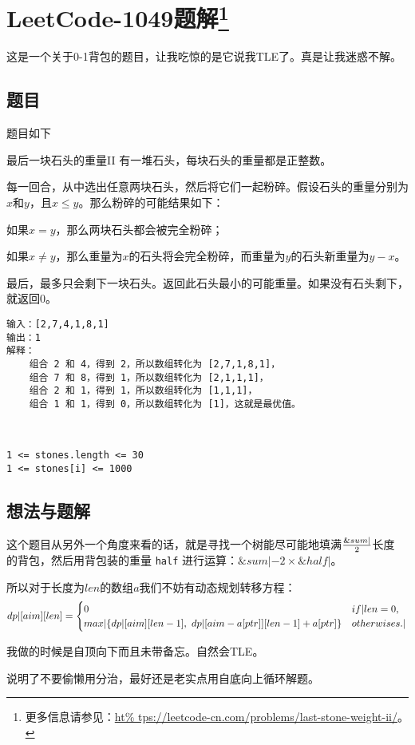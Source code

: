 
\section[LeetCode-1049题解]{LeetCode-1049题解\footnote{更多信息请参见：\url{ht%
tps://leetcode-cn.com/problems/last-stone-weight-ii/}。}}

这是一个关于0-1背包的题目，让我吃惊的是它说我TLE了。真是让我迷惑不解。

\subsection{题目}

题目如下
\begin{Exple}{最后一块石头的重量II}
有一堆石头，每块石头的重量都是正整数。

每一回合，从中选出任意两块石头，然后将它们一起粉碎。假设石头的重量分别为$x$和$y$，且$x\le y$。那么粉碎的可能结果如下：

如果$x=y$，那么两块石头都会被完全粉碎；

如果$x\ne y$，那么重量为$x$的石头将会完全粉碎，而重量为$y$的石头新重量为$y-x$。

最后，最多只会剩下一块石头。返回此石头最小的可能重量。如果没有石头剩下，就返回$0$。

\begin{lstlisting}
输入：[2,7,4,1,8,1]
输出：1
解释：
    组合 2 和 4，得到 2，所以数组转化为 [2,7,1,8,1]，
    组合 7 和 8，得到 1，所以数组转化为 [2,1,1,1]，
    组合 2 和 1，得到 1，所以数组转化为 [1,1,1]，
    组合 1 和 1，得到 0，所以数组转化为 [1]，这就是最优值。
\end{lstlisting}
 
\begin{lstlisting}
1 <= stones.length <= 30
1 <= stones[i] <= 1000
\end{lstlisting}
\end{Exple}

\subsection{想法与题解}

这个题目从另外一个角度来看的话，就是寻找一个树能尽可能地填满$\&sum|\over 2$长度
的背包，然后用背包装的重量 \verb|half| 进行运算：$\&sum| - 2 \times \&half|$。

所以对于长度为$len$的数组$a$我们不妨有动态规划转移方程：
$$\*dp|[aim][len] = \begin{cases}
    0                                                                  & \*if |len=0,\\
    \*max|\{\*dp|[aim][len - 1],\ \*dp|[aim-a[ptr]][len - 1] + a[ptr]\} & \*otherwises.|
\end{cases}$$

我做的时候是自顶向下而且未带备忘。自然会TLE。

说明了不要偷懒用分治，最好还是老实点用自底向上循环解题。


